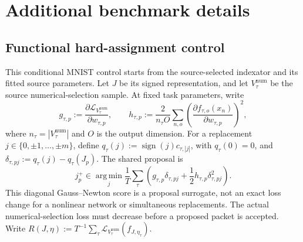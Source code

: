 \appendix
\section{Additional benchmark details}

\subsection{Functional hard-assignment control}
\label{app:functional}

This conditional MNIST control starts from the source-selected
indexator and its fitted source parameters. Let $J$ be its signed
representation, and let $V_\tau^{\mathrm{num}}$ be the source
numerical-selection sample. At fixed task parameters, write
\begin{equation}
    g_{\tau,p}:=\frac{\partial
        \mathcal L_{V_\tau^{\mathrm{num}}}}{\partial w_{\tau,p}},
    \qquad
    h_{\tau,p}:=\frac{2}{n_\tau O}
        \sum_{n,o}\left(
            \frac{\partial f_{\tau,o}(x_n)}{\partial w_{\tau,p}}
        \right)^2,
    \label{eq:benchmark-functional-ggn}
\end{equation}
where $n_\tau=|V_\tau^{\mathrm{num}}|$ and $O$ is the output dimension.
For a replacement $j\in\{0,\pm1,\ldots,\pm m\}$, define
$q_\tau(j):=\operatorname{sign}(j)c_{\tau,|j|}$, with $q_\tau(0)=0$,
and $\delta_{\tau,pj}:=q_\tau(j)-q_\tau(J_p)$. The shared proposal is
\begin{equation}
    j_p^+\in\operatorname*{arg\,min}_j
        \frac1T\sum_\tau
        \left(g_{\tau,p}\delta_{\tau,pj}
            +\frac12h_{\tau,p}\delta_{\tau,pj}^2\right).
    \label{eq:benchmark-functional-move}
\end{equation}
This diagonal Gauss--Newton score is a proposal surrogate, not an exact
loss change for a nonlinear network or simultaneous replacements.
The actual numerical-selection loss must decrease before a proposed
packet is accepted.
Write $R(J,\eta):=T^{-1}\sum_\tau
\mathcal L_{V_\tau^{\mathrm{num}}}(f_{J,\eta_\tau})$.

